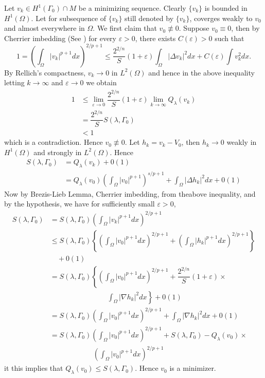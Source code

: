 \begin{sketch of the proof}
\begin{enumerate}[\rm \bf Step 1.]
Let $v_{k} \in H^{1}(\Gamma_{0})\cap M$ be a minimizing sequence. Clearly $\{v_{k}\}$ is bounded in $H^{1}(\Omega)$. Let for subsequence of $\{v_{k}\}$ still denoted by $\{v_{k}\}$, coverges weakly to $v_{0}$ and almost everywhere in $\Omega$. We first claim that $v_{0}\nequiv 0$. Suppose $v_{0}\equiv 0$, then by Cherrier imbedding (See \cite{art2-key8}) for every $\varepsilon > 0$, there exists $C(\varepsilon) > 0$ such that
 $$
 1 = \left(\int_{\Omega}|v_{k}|^{p+1}dx\right)^{2/p+1} \leq \dfrac{2^{2/n}}{S}(1+\varepsilon) \int_{\Omega}|\Delta v_{k}|^{2}dx + C(\varepsilon)\int v_{k}^{2}dx.
$$
By Rellich's compactness, $v_{k} \rightarrow 0$ in $L^{2}(\Omega)$ and hence in the above inequality letting $k \rightarrow \infty$ and $\varepsilon \rightarrow 0$ we obtain
\begin{align*}
1 &\leq \lim_{\varepsilon \rightarrow 0}\dfrac{2^{2/n}}{S}(1+\varepsilon) \lim_{k \rightarrow \infty} Q_{\lambda}(v_{k})\\
&= \dfrac{2^{2/n}}{S}S(\lambda, \Gamma_{0})\\
&< 1
\end{align*}
which is a contradiction. Hence $v_{0}\nequiv 0$. Let $h_{k} = v_{k}-V_{0}$, then $h_{k}\rightarrow 0$ weakly in $H^{1}(\Omega)$ and strongly in $L^{2}(\Omega)$. Hence
\begin{align*}
S(\lambda, \Gamma_{0}) &= Q_{\lambda}(v_{k}) + 0(1)\\
&= Q_{\lambda}(v_{0})\left(\int_{\Omega} |v_{0}|^{p+1}\right)^{s/p+1} + \int_{\Omega} |\Delta h_{k}|^{2}dx + 0(1)
\end{align*}
Now by Brezis-Lieb Lemma, Cherrier imbedding, from the\break above inequality, and by the hypothesis, we have for sufficiently small $\varepsilon > 0$,
\begin{align*}
S(\lambda, \Gamma_{0}) &= S(\lambda, \Gamma_{0}) \left(\int_{\Omega}|v_{k}|^{p+1}dx\right)^{2/p+1}\\
&\leq S(\lambda, \Gamma_{0}) \left\{\left(\int_{\Omega}|v_{0}|^{p+1}dx\right)^{2/p+1} + \left(\int_{\Omega}|h_{k}|^{p+1}dx\right)^{2/p+1}\right\} \\
&\quad + 0(1)\\
&= S(\lambda, \Gamma_{0}) \left\{\left(\int_{\Omega}|v_{0}|^{p+1}dx\right)^{2/p+1} +\dfrac{2^{2/n}}{S}(1 +              \varepsilon)\times \right. \\
&\qquad\qquad\qquad\qquad \left.\int_{\Omega}|\nabla h_{k}|^{2}dx\right\} + 0(1)\\
&= S(\lambda, \Gamma_{0}) \left(\int_{\Omega}|v_{0}|^{p+1}dx\right)^{2/p+1} + \int_{\Omega}|\nabla h_{k}|^{2}dx + 0(1)\\
&= S(\lambda, \Gamma_{0}) \left(\int_{\Omega}|v_{0}|^{p+1}dx\right)^{2/p+1} + S(\lambda, \Gamma_{0})-Q_{\lambda}(v_{0}) \times \\
&\qquad \qquad \qquad \left(\int_{\Omega}|v_{0}|^{p+1}dx\right)^{2/p+1} 
\end{align*}it
this implies that $Q_{\lambda}(v_{0}) \leq S(\lambda,\Gamma_{0})$. Hence $v_{0}$ is a minimizer.


\end{enumerate}
\end{sketch of the proof}
